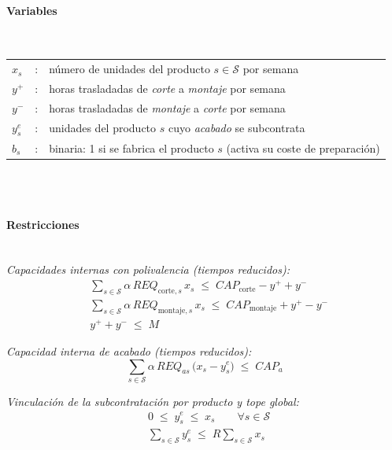 \paragraph{Variables}\mbox{}\\
\begin{tabular}{l c l}
    $x_s$     & : & número de unidades del producto $s \in \mathcal{S}$ por semana \\
    $y^+$     & : & horas trasladadas de \textit{corte} a \textit{montaje} por semana \\
    $y^-$     & : & horas trasladadas de \textit{montaje} a \textit{corte} por semana \\
    $y_s^{e}$ & : & unidades del producto $s$ cuyo \textit{acabado} se subcontrata \\
    $b_s$     & : & binaria: 1 si se fabrica el producto $s$ (activa su coste de preparación) \\
\end{tabular}
\\
\\

\paragraph{Restricciones}\mbox{}\\
\emph{Capacidades internas con polivalencia (tiempos reducidos):}
\begin{align}
    & \sum_{s \in \mathcal{S}} \alpha\,REQ_{\text{corte},s}\, x_s \;\le\; CAP_{\text{corte}} - y^+ + y^- \\
    & \sum_{s \in \mathcal{S}} \alpha\,REQ_{\text{montaje},s}\, x_s \;\le\; CAP_{\text{montaje}} + y^+ - y^- \\
    & y^+ + y^- \;\le\; M
\end{align}

\emph{Capacidad interna de \textit{acabado} (tiempos reducidos):}
\begin{equation}
    \sum_{s \in \mathcal{S}} \alpha\,REQ_{a s}\,\big(x_s - y_s^{e}\big) \;\le\; CAP_a
\end{equation}

\emph{Vinculación de la subcontratación por producto y tope global:}
\begin{align}
    & 0 \;\le\; y_s^{e} \;\le\; x_s \qquad \forall s \in \mathcal{S} \\
    & \sum_{s \in \mathcal{S}} y_s^{e} \;\le\; R \sum_{s \in \mathcal{S}} x_s
\end{align}

